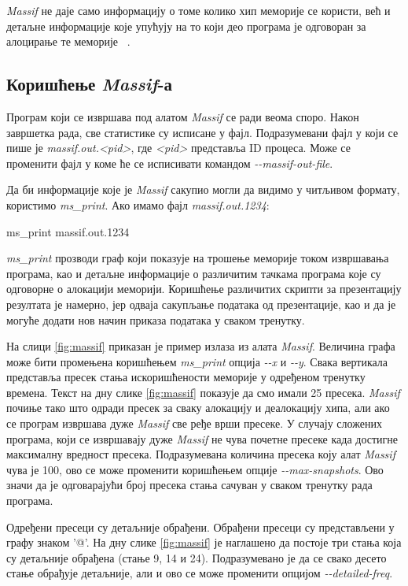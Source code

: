 \documentclass[12pt,oneside]{memoir}
\begin{document}
\indent \textit{Massif} не даје само информацију о томе колико хип меморије се користи, већ и детаљне информације које упућују на то који део програма је одговоран за алоцирање те меморије ~\cite{massifdRef}.

\subsection{Коришћење \textit{Massif}-а}


\indent Програм који се извршава под алатом \textit{Massif} се ради веома споро. Након завршетка рада, све статистике су исписане у фајл. Подразумевани фајл у који се пише је \textit{massif.out.<pid>}, где \textit{<pid>} представља ID процеса. Може се променити фајл у коме ће се исписивати командом \textit{-\--massif-out-file}.

\indent Да би информације које је \textit{Massif} сакупио могли да видимо у читљивом формату, користимо \textit{ms\_print}. Ако имамо фајл \textit{massif.out.1234}: 


\begin{center}
 ms\_print massif.out.1234
\end{center}

\indent \textit{ms\_print} прозводи граф који показује на трошење меморије током извршавања програма, као и детаљне информације о различитим тачкама програма које су одговорне о алокацији меморији. Коришћење различитих скрипти за презентацију резултата је намерно, јер одваја сакупљање података од презентације, као и да је могуће додати нов начин приказа података у сваком тренутку.

\indent На слици \ref{fig:massif} приказан је пример излаза из алата \textit{Massif}. Величина графа може бити промењена коришћењем \textit{ms\_print} опција \textit{-\--x} и \textit{-\--y}. Свака вертикала представља пресек стања искоришћености меморије у одређеном тренутку времена. Текст на дну слике \ref{fig:massif} показује да смо имали 25 пресека. \textit{Massif} почиње тако што одради пресек за сваку алокацију и деалокацију хипа, али ако се програм извршава дуже \textit{Massif} све ређе врши пресеке. У случају сложених програма, који се извршавају дуже \textit{Massif} не чува почетне пресеке када достигне максималну вредност пресека. Подразумевана количина пресека коју алат \textit{Massif} чува је 100, ово се може променити коришћењем опције \textit{-\--max-snapshots}. Ово значи да је одговарајући број пресека стања сачуван у сваком тренутку рада програма.

\indent Одређени пресеци су детаљније обрађени. Обрађени пресеци су представљени у графу знаком '@'. На дну слике \ref{fig:massif} је наглашено да постоје три стања која су детаљније обрађена (стање 9, 14 и 24). Подразумевано је да се свако десето стање обрађује детаљније, али и ово се може променити опцијом \textit{-\--detailed-freq}.
\end{document}
